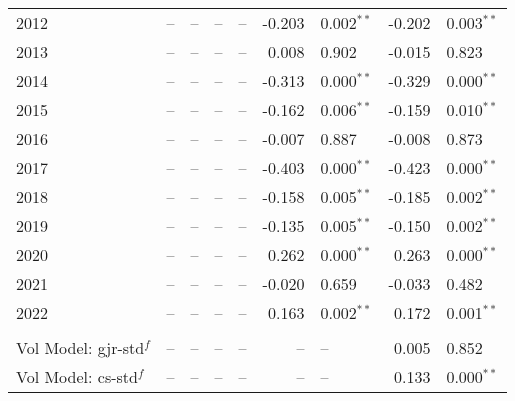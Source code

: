 \documentclass[12pt]{report}
\begin{document}
\begin{table}[!ht]
\begin{tabular}{l r l r l r l r l}
        2012                               &      -- & --           &      -- & --            &      -0.203 & 0.002$^{**}$   &  -0.202 & 0.003$^{**}$   \\
        2013                               &      -- & --           &      -- & --            &       0.008 & 0.902          &  -0.015 & 0.823          \\
        2014                               &      -- & --           &      -- & --            &      -0.313 & 0.000$^{**}$   &  -0.329 & 0.000$^{**}$   \\
        2015                               &      -- & --           &      -- & --            &      -0.162 & 0.006$^{**}$   &  -0.159 & 0.010$^{**}$   \\
        2016                               &      -- & --           &      -- & --            &      -0.007 & 0.887          &  -0.008 & 0.873          \\
        2017                               &      -- & --           &      -- & --            &      -0.403 & 0.000$^{**}$   &  -0.423 & 0.000$^{**}$   \\
        2018                               &      -- & --           &      -- & --            &      -0.158 & 0.005$^{**}$   &  -0.185 & 0.002$^{**}$   \\
        2019                               &      -- & --           &      -- & --            &      -0.135 & 0.005$^{**}$   &  -0.150 & 0.002$^{**}$   \\
        2020                               &      -- & --           &      -- & --            &       0.262 & 0.000$^{**}$   &   0.263 & 0.000$^{**}$   \\
        2021                               &      -- & --           &      -- & --            &      -0.020 & 0.659          &  -0.033 & 0.482          \\
        2022                               &      -- & --           &      -- & --            &       0.163 & 0.002$^{**}$   &   0.172 & 0.001$^{**}$   \\
                                                                                                                                                  \\
        Vol Model: gjr-std$^{f}$           &      -- & --           &      -- & --            &          -- & --             &   0.005 & 0.852          \\
        Vol Model: cs-std$^{f}$            &      -- & --           &      -- & --            &          -- & --             &   0.133 & 0.000$^{**}$   \\

\end{tabular}
\end{table}
\end{document}
